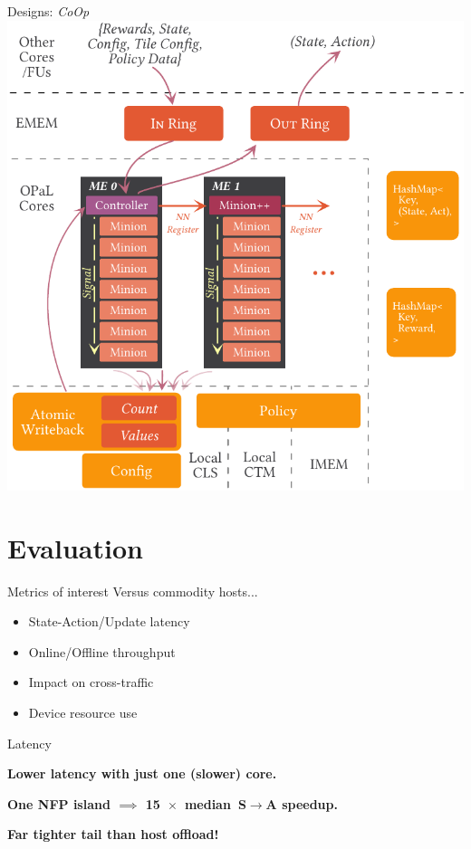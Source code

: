 \documentclass[aspectratio=169,xcolor={dvipsnames}
,handout
]{beamer}
\begin{document}
\begin{frame}{Designs: \emph{CoOp}}
	\centering
	\includegraphics[width=0.535\linewidth]{../paper/figures/coop}
\end{frame}

\section{Evaluation}

\begin{frame}{Metrics of interest}
	Versus commodity hosts...
	\begin{itemize}[<+->]
		\item State-Action/Update latency
		\item Online/Offline throughput
		\item Impact on cross-traffic
		\item Device resource use
	\end{itemize}
\end{frame}

\begin{frame}{Latency}
	\centering
	\pause
	
	\textbf{Lower latency with \alert{just one (slower) core}.}\pause
	
	\textbf{One NFP island $\implies$ \alert{\SI{15}{$\times$} median S$\rightarrow$A speedup}.}\pause
	
	\textbf{Far tighter tail than host offload!}
\end{frame}
\end{document}
